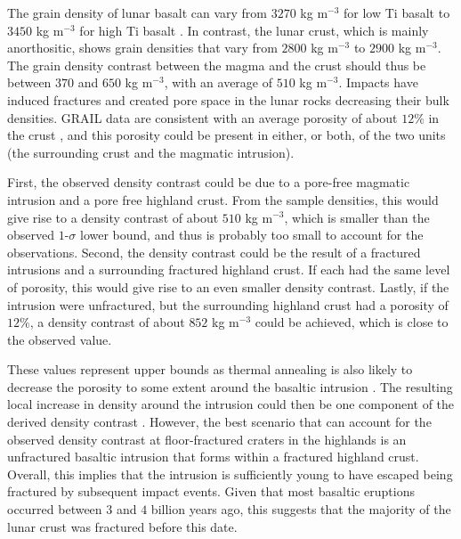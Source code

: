 The grain density of lunar basalt can vary from $3270$ kg m$^{-3}$ for
low   Ti  basalt   to  $3450$   kg   m$^{-3}$  for   high  Ti   basalt
\citep{Kiefer:2012kp}.  In contrast, the  lunar crust, which is mainly
anorthositic, shows grain densities that  vary from $2800$ kg m$^{-3}$
to $ 2900$  kg m$^{-3}$. The grain density contrast  between the magma
and the crust should thus be between $370$ and $650$ kg m$^{-3}$, with
an average  of $510$ kg  m$^{-3}$. Impacts have induced  fractures and
created pore space in the lunar rocks decreasing their bulk densities.
GRAIL data are consistent with an  average porosity of about $12\%$ in
the  crust  \citep{Wieczorek:2013ipa},  and  this  porosity  could  be
present in  either, or both, of  the two units (the  surrounding crust
and the magmatic intrusion).

First,  the observed  density contrast  could  be due  to a  pore-free
magmatic intrusion  and a  pore free highland  crust. From  the sample
densities, this would  give rise to a density contrast  of about $510$
kg m$^{-3}$,  which is  smaller than  the observed  $1$-$\sigma$ lower
bound, and thus is probably too small to account for the observations.
Second,  the density  contrast  could  be the  result  of a  fractured
intrusions and  a surrounding fractured  highland crust.  If  each had
the same  level of porosity, this  would give rise to  an even smaller
density contrast.  Lastly, if the  intrusion were unfractured, but the
surrounding  highland  crust  had  a porosity  of  $12\%$,  a  density
contrast of about $852$ kg m$^{-3}$  could be achieved, which is close
to the observed value.

These  values represent  upper  bounds as  thermal  annealing is  also
likely to  decrease the  porosity to some  extent around  the basaltic
intrusion  \citep{Michaut:2011dt}.  The  resulting  local increase  in
density  around the  intrusion  could  then be  one  component of  the
derived  density  contrast  \citep{Kiefer:2013hr}. However,  the  best
scenario  that  can  account  for the  observed  density  contrast  at
floor-fractured craters  in the  highlands is an  unfractured basaltic
intrusion that forms within a fractured highland crust.  Overall, this
implies that the intrusion is sufficiently young to have escaped being
fractured  by  subsequent impact  events.   Given  that most  basaltic
eruptions  occurred  between  $3$  and $4$  billion  years  ago,  this
suggests that  the majority  of the lunar  crust was  fractured before
this date.

